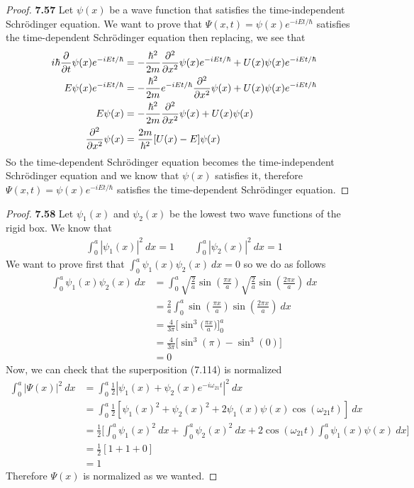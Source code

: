 \documentclass[11pt]{article}
\theoremstyle{definition}
\begin{document}
\cleardoublepage
\begin{proof}{\textbf{7.57}}
Let $\psi(x)$ be a wave function that satisfies the time-independent
Schrödinger equation. We want to prove that $\Psi(x,t) = \psi(x)e^{-iEt/\hbar}$
satisfies the time-dependent Schrödinger equation then replacing, we see that
\begin{align*}
    i\hbar \pdv{t}\psi(x)e^{-iEt/\hbar}
    &= -\frac{\hbar^2}{2m}\pdv[2]{x}\psi(x) e^{-iEt/\hbar}
    + U(x)\psi(x)e^{-iEt/\hbar}\\
    E\psi(x) e^{-iEt/\hbar}
    &= -\frac{\hbar^2}{2m}e^{-iEt/\hbar}\pdv[2]{x}\psi(x)
    + U(x)\psi(x)e^{-iEt/\hbar}\\
    E\psi(x) &= - \frac{\hbar^2}{2m}\pdv[2]{x}\psi(x) + U(x)\psi(x)\\
    \pdv[2]{x}\psi(x) &= \frac{2m}{\hbar^2}[U(x) - E]\psi(x)
\end{align*}
So the time-dependent Schrödinger equation becomes the time-independent
Schrödinger equation and we know that $\psi(x)$ satisfies it, therefore
$\Psi(x,t) = \psi(x)e^{-iEt/\hbar}$ satisfies the time-dependent Schrödinger
equation.
\end{proof}

\cleardoublepage
\begin{proof}{\textbf{7.58}}
Let $\psi_1(x)$ and $\psi_2(x)$ be the lowest two wave functions of the rigid
box. We know that
\begin{align*}
    \int_0^a |\psi_1(x)|^2~dx = 1 \qquad \int_0^a |\psi_2(x)|^2~dx = 1
\end{align*}
We want to prove first that $\int_0^a \psi_1(x)\psi_2(x)~dx = 0$ so we do as
follows
\begin{align*}
    \int_0^a \psi_1(x)\psi_2(x)~dx
    &= \int_0^a \sqrt{\frac{2}{a}}\sin(\frac{\pi x}{a})
    \sqrt{\frac{2}{a}}\sin(\frac{2\pi x}{a})~dx\\
    &= \frac{2}{a} \int_0^a \sin(\frac{\pi x}{a})\sin(\frac{2\pi x}{a})~dx\\
    &= \frac{4}{3\pi } \bigg[\sin^3\bigg(\frac{\pi x}{a}\bigg)\bigg]_0^a\\
    &= \frac{4}{3\pi } \bigg[\sin^3(\pi) - \sin^3(0)\bigg]\\
    &= 0
\end{align*}
Now, we can check that the superposition (7.114) is normalized
\begin{align*}
\int_0^a |\Psi(x)|^2~dx
&= \int_0^a \frac{1}{2}|\psi_1(x) + \psi_2(x)e^{-i\omega_{21}t}|^2~dx\\
&= \int_0^a \frac{1}{2}[\psi_1(x)^2 + \psi_2(x)^2 + 2\psi_1(x)\psi(x)\cos(\omega_{21}t)]~dx\\
&= \frac{1}{2}\bigg[
    \int_0^a \psi_1(x)^2~dx
    + \int_0^a \psi_2(x)^2~dx
    + 2\cos(\omega_{21}t)\int_{0}^a \psi_1(x)\psi(x)~dx
\bigg]\\
&= \frac{1}{2}[1 + 1 + 0]\\
&= 1 
\end{align*}
Therefore $\Psi(x)$ is normalized as we wanted.
\end{proof}
\end{document}
